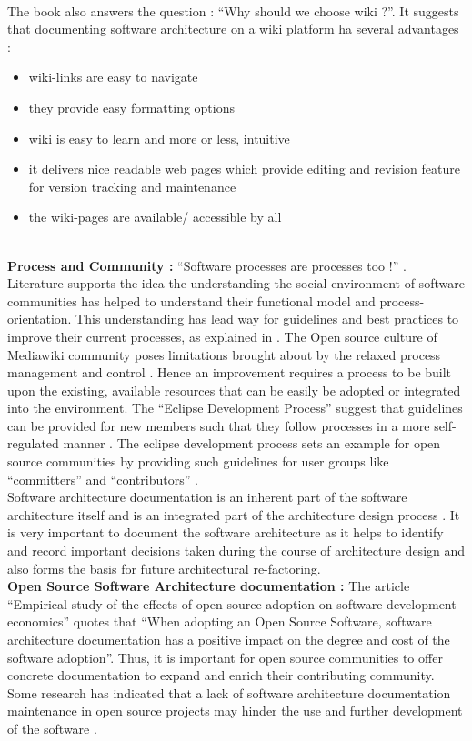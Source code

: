 \\\indent The book also answers the question : \enquote{Why should we choose wiki ?}. It suggests that documenting software architecture on a wiki platform ha several advantages :
\begin{itemize}
\item wiki-links are easy to navigate
\item they provide easy formatting options 
\item wiki is easy to learn and more or less, intuitive
\item it delivers nice readable web pages which provide editing and revision feature for version tracking and maintenance
\item the wiki-pages are available/ accessible by all
\end{itemize}
\indent
\\\indent \textbf{Process and Community : } \enquote{Software processes are processes too !} \cite{Fuggeffa1988}. Literature supports the idea the understanding the social environment of software communities has helped to understand their functional model and process-orientation. This understanding has lead way for guidelines and best practices to improve their current processes, as explained in \cite{bab2009}. The Open source culture of Mediawiki community poses limitations brought about by the relaxed process management and control \cite{6923128}. Hence an improvement requires a process to be built upon the existing, available resources that can be easily be adopted or integrated into the environment. The \enquote{Eclipse Development Process} suggest that guidelines can be provided for new members such that they follow processes in a more self-regulated manner \cite{eclipse2013}. The eclipse development process sets an example for open source communities by providing such guidelines for user groups like \enquote{committers} and \enquote{contributors} .
\\\indent Software architecture documentation is an inherent part of the software architecture itself and is an integrated part of the architecture design process \cite{Shahin2009}. It is very important to document the software architecture as it helps to identify and record important decisions taken during the course of architecture design and also forms the basis for future architectural re-factoring.
\newline
\\\indent \textbf{Open Source Software Architecture documentation : } The article \enquote{Empirical study of the effects of open source adoption on software development economics} \cite{Ajila2007} quotes that \enquote{When adopting an Open Source Software, software architecture documentation has a positive impact on the degree and cost of the software adoption}. Thus, it is important for open source communities to offer concrete documentation to expand and enrich their contributing community. Some research has indicated that a lack of software architecture documentation maintenance in open source projects may hinder the use and further development of the software \cite{michlmayr:quality_problems}.
